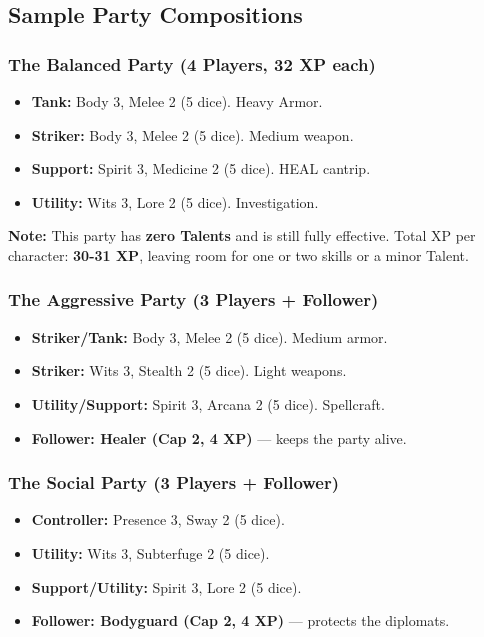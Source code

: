 \subsection{Sample Party Compositions}

\subsubsection{The Balanced Party (4 Players, 32 XP each)}

\begin{itemize}
  \item \textbf{Tank:} Body 3, Melee 2 (5 dice). Heavy Armor.
  \item \textbf{Striker:} Body 3, Melee 2 (5 dice). Medium weapon.
  \item \textbf{Support:} Spirit 3, Medicine 2 (5 dice). HEAL cantrip.
  \item \textbf{Utility:} Wits 3, Lore 2 (5 dice). Investigation.
\end{itemize}

\textbf{Note:} This party has \textbf{zero Talents} and is still fully effective. Total XP per character: \textbf{30-31 XP}, leaving room for one or two skills or a minor Talent.

\subsubsection{The Aggressive Party (3 Players + Follower)}

\begin{itemize}
  \item \textbf{Striker/Tank:} Body 3, Melee 2 (5 dice). Medium armor.
  \item \textbf{Striker:} Wits 3, Stealth 2 (5 dice). Light weapons.
  \item \textbf{Utility/Support:} Spirit 3, Arcana 2 (5 dice). Spellcraft.
  \item \textbf{Follower: Healer (Cap 2, 4 XP)} --- keeps the party alive.
\end{itemize}

\subsubsection{The Social Party (3 Players + Follower)}

\begin{itemize}
  \item \textbf{Controller:} Presence 3, Sway 2 (5 dice).
  \item \textbf{Utility:} Wits 3, Subterfuge 2 (5 dice).
  \item \textbf{Support/Utility:} Spirit 3, Lore 2 (5 dice).
  \item \textbf{Follower: Bodyguard (Cap 2, 4 XP)} --- protects the diplomats.
\end{itemize}

